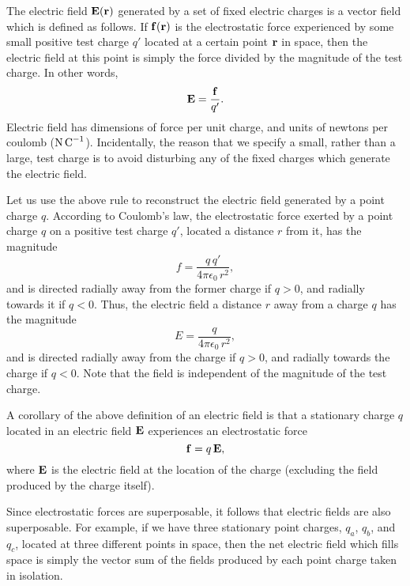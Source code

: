 The electric field ${\bf E}({\bf r})$ generated by a set of fixed electric charges is a vector field which is defined as follows.
If ${\bf f}({\bf r})$ is the electrostatic force experienced by some small positive
test charge $q'$ located at a certain point ${\bf r}$ in space, then the electric field at
this point is simply the force divided by the magnitude of the test
charge. In other words,
\begin{equation}
{\bf E} = \frac{\bf f}{q'}.
\end{equation}
Electric field  has dimensions of force per unit charge, and
units of newtons per coulomb (${\rm N \,C}^{-1}$). Incidentally, the reason
that we specify a small, rather than a large,
 test charge is to avoid disturbing any of 
the  fixed charges
which generate the electric  field.

Let us use the above rule to reconstruct the electric field generated by
a point charge $q$. According to Coulomb's law, the electrostatic force
exerted by a point charge $q$ on a positive test charge $q'$, located a distance
$r$ from it, has the magnitude
\begin{equation}
f = \frac{q\,q'}{4\pi\epsilon_0\,r^2},
\end{equation}
and is directed radially away from the former charge if $q>0$, and radially
towards it if $q<0$. Thus, the electric field a distance $r$
away from a charge $q$ has the magnitude
\begin{equation}
E= \frac{q}{4\pi\epsilon_0\,r^2},
\end{equation}
and is directed radially away from the charge if $q>0$, and radially towards
the charge if $q<0$. Note that the field is independent of the magnitude
of the test charge. 

A corollary of the above definition of an electric field is that  a stationary charge
$q$  located in an electric field ${\bf E}$ experiences an electrostatic force
\begin{equation}\label{e3.12}
{\bf f} = q \,{\bf E},
\end{equation}
where ${\bf E}$ is the electric field at the location of the charge
(excluding the field produced by the charge itself). 

Since electrostatic forces are superposable, it follows that electric fields are also superposable.
For example, if we have three stationary
point charges, $q_a$, $q_b$, and $q_c$, located at three different points in space,
then the net electric field which fills space is simply the vector sum of the fields produced
by each point charge taken in isolation. 

